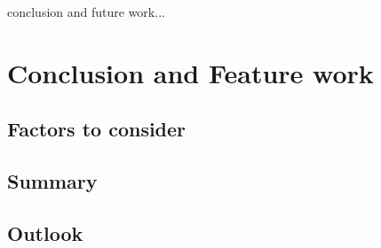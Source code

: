 conclusion and future work...

\section{Conclusion and Feature work}


\subsection{Factors to consider}

\subsection{Summary}

\subsection{Outlook}